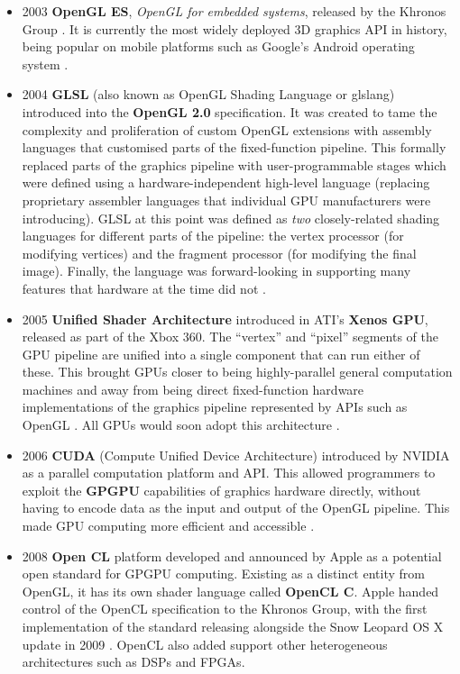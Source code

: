 \documentclass[a4paper,12pt,twoside,openright]{report}
\begin{document}
\begin{itemize}
    \item 2003 \textbf{OpenGL ES}, \textit{OpenGL for embedded systems},
    released by the Khronos Group \cite{OpenGLESRelease}. It is currently the
    most widely deployed 3D graphics API in history, being popular on mobile
    platforms such as Google's Android operating system \cite{OpenGLES}.

    \item 2004 \textbf{GLSL} (also known as OpenGL Shading Language or glslang)
    introduced into the \textbf{OpenGL 2.0} specification. It was created to
    tame the complexity and proliferation of custom OpenGL extensions with
    assembly languages that customised parts of the fixed-function pipeline.
    This formally replaced parts of the graphics pipeline with
    user-programmable stages which were defined using a hardware-independent
    high-level language (replacing proprietary assembler languages that
    individual GPU manufacturers were introducing). GLSL at this point was
    defined as \textit{two} closely-related shading languages for different
    parts of the pipeline: the vertex processor (for modifying vertices) and
    the fragment processor (for modifying the final image). Finally, the
    language was forward-looking in supporting many features that hardware at
    the time did not \cite{GLSL_1_10}.

    \item 2005 \textbf{Unified Shader Architecture} introduced in ATI's
    \textbf{Xenos GPU}, released as part of the Xbox 360. The ``vertex'' and
    ``pixel'' segments of the GPU pipeline are unified into a single component
    that can run either of these. This brought GPUs closer to being highly-parallel
    general computation machines and away from being direct fixed-function
    hardware implementations of the graphics pipeline represented by APIs such
    as OpenGL \cite{XenosDemystified}. All GPUs would soon adopt this
    architecture \cite{HistoryOfTheGPU}.

    \item 2006 \textbf{CUDA} (Compute Unified Device Architecture) introduced
    by NVIDIA as a parallel computation platform and API. This allowed
    programmers to exploit the \textbf{GPGPU} capabilities of graphics hardware
    directly, without having to encode data as the input and output of the
    OpenGL pipeline. This made GPU computing more efficient and accessible
    \cite{AboutCUDA}.

    \item 2008 \textbf{Open CL} platform developed and announced by Apple as a
    potential open standard for GPGPU computing. Existing as a distinct entity
    from OpenGL, it has its own shader language called \textbf{OpenCL C}. Apple
    handed control of the OpenCL specification to the Khronos Group, with the
    first implementation of the standard releasing alongside the Snow Leopard
    OS X update in 2009 \cite{OpenCL}. OpenCL also added support other
    heterogeneous architectures such as DSPs and FPGAs.


\end{itemize}
\end{document}
